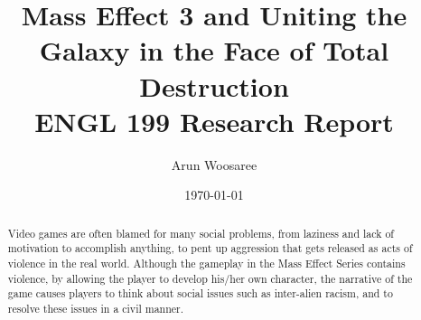 \documentclass[journal]{IEEEtran}
\title{Mass Effect 3 and Uniting the Galaxy in the Face of Total Destruction\\
\vspace{.25cm}\large ENGL 199 Research Report \vspace{-.5cm}}
\author{\LARGE Arun Woosaree}
\date{\today}
\begin{document}
\maketitle %
\begin{abstract}
 Video games are often blamed for many social problems,
 from laziness and lack of motivation to accomplish anything, to pent up aggression that gets released as acts of violence in the real world. Although the gameplay in the Mass Effect Series contains violence, by allowing the player to develop his/her own character, the narrative of the game causes players to think about social issues such as inter-alien racism, and to resolve these issues in a civil manner.
\end{abstract}
\end{document}
